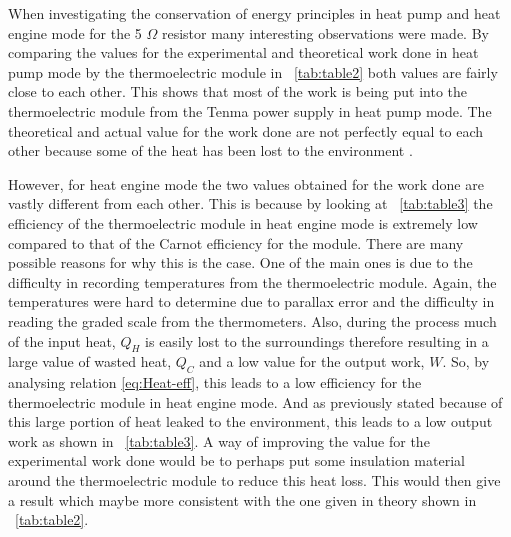 \documentclass{article}
\newcommand{\tabref}[2][\tablename~]{#1\ref{#2}}
\begin{document}
\vspace{2mm}
\noindent
When investigating the conservation of energy principles in heat pump and heat engine mode for the 5 $\Omega$ resistor many interesting observations were made. By comparing the values for the experimental and theoretical work done in heat pump mode by the thermoelectric module in \tabref{tab:table2} both values are fairly close to each other. This shows that most of the work is being put into the thermoelectric module from the Tenma power supply in heat pump mode. The theoretical and actual value for the work done are not perfectly equal to each other because some of the heat has been lost to the environment \cite{Paper02}. 

\vspace{2mm}
\noindent
However, for heat engine mode the two values obtained for the work done are vastly different from each other. This is because by looking at \tabref{tab:table3} the efficiency of the thermoelectric module in heat engine mode is extremely low compared to that of the Carnot efficiency for the module. There are many possible reasons for why this is the case. One of the main ones is due to the difficulty in recording temperatures from the thermoelectric module. Again, the temperatures were hard to determine due to parallax error and the difficulty in reading the graded scale from the thermometers. Also, during the process much of the input heat, $Q_H$ is easily lost to the surroundings therefore resulting in a large value of wasted heat, $Q_C$ and a low value for the output work, $W$. So, by analysing relation \eqref{eq:Heat-eff}, this leads to a low efficiency for the thermoelectric module in heat engine mode. And as previously stated because of this large portion of heat leaked to the environment, this leads to a low output work as shown in \tabref{tab:table3}. A way of improving the value for the experimental work done would be to perhaps put some insulation material around the thermoelectric module to reduce this heat loss. This would then give a result which maybe more consistent with the one given in theory shown in \tabref{tab:table2}.
\end{document}
